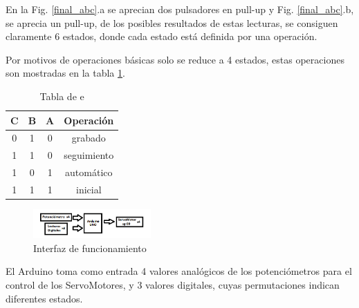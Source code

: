 \documentclass[gra_conf.tex]{subfiles}
\begin{document}
En la Fig. \ref{final_abc}.a se aprecian dos pulsadores en pull-up
y Fig. \ref{final_abc}.b, se aprecia un pull-up, de los posibles
resultados de estas lecturas, se consiguen claramente 6 estados,
donde cada estado está definida por una operación. 

Por motivos de operaciones básicas solo se reduce a 4 estados, estas 
operaciones son mostradas en la tabla \ref{table:states}.

\begin{table}
  \caption{Tabla de e}
  \label{table:states}
  \begin{center}
    \begin{tabular}{|c|c|c|c|}
      \hline
      C & B & A & Operación \\
      \hline
      0 & 1 & 0 & grabado \\
      \hline
      1 & 1 & 0 & seguimiento \\
      \hline
      1 & 0 & 1 & automático\\
      \hline
      1 & 1 & 1 & inicial\\
      \hline
    \end{tabular}
  \end{center}
\end{table}
   
\begin{figure}[h]
  \centering
  \includegraphics[width=0.4\textwidth]{../img/Interfaz.png}
  \caption{Interfaz de funcionamiento}
  \label{state_abc}
\end{figure}

El Arduino toma como entrada 4 valores analógicos de los potenciómetros
para el control de los ServoMotores, y 3 valores digitales, cuyas
permutaciones indican diferentes estados.
\end{document}
